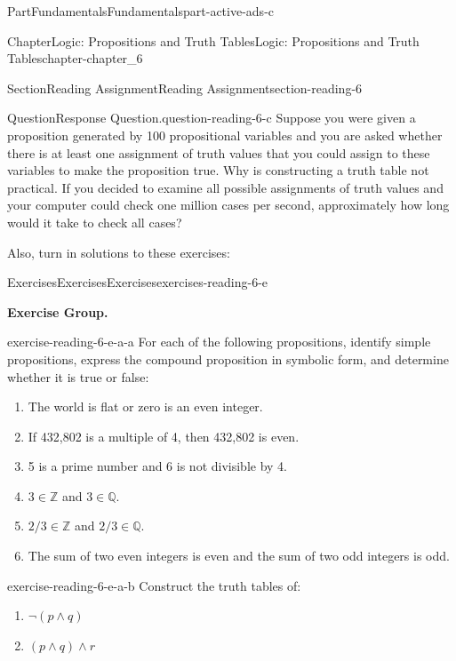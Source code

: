 \documentclass[oneside,10pt,]{book}
\numberwithin{equation}{section}
\begin{document}
\begin{partptx}{Part}{Fundamentals}{}{Fundamentals}{}{}{part-active-ads-c}
\begin{chapterptx}{Chapter}{Logic: Propositions and Truth Tables}{}{Logic: Propositions and Truth Tables}{}{}{chapter-chapter_6}
\begin{sectionptx}{Section}{Reading Assignment}{}{Reading Assignment}{}{}{section-reading-6}
\begin{question}{Question}{Response Question.}{question-reading-6-c}
Suppose you were given a proposition generated by 100 propositional variables and you are asked whether there is at least one assignment of truth values that you could assign to these variables to make the proposition true. Why is constructing a truth table not practical.  If you decided to examine all possible assignments of truth values and your computer could check one million cases per second, approximately how long would it take to check all cases?%
\end{question}
Also, turn in solutions to these exercises:%
%
%
\typeout{************************************************}
\typeout{************************************************}
%
\begin{exercises-subsection-numberless}{Exercises}{Exercises}{}{Exercises}{}{}{exercises-reading-6-e}
\par\medskip\noindent%
\textbf{Exercise Group.}\space\space%
\begin{exercisegroup}
\begin{divisionexerciseeg}{1}{}{}{exercise-reading-6-e-a-a}%
For each of the following propositions, identify simple propositions, express the compound proposition in symbolic form, and determine whether it is true or false:%
\par
%
\begin{enumerate}[label=(\alph*)]
\item{}The world is flat or zero is an even integer.%
\item{}If 432,802 is a multiple of 4, then 432,802 is even.%
\item{}5 is a prime number and 6 is not divisible by 4.%
\item{}\(3 \in \mathbb{Z}\) and \(3 \in  \mathbb{Q}\).%
\item{}\(2/3 \in  \mathbb{Z}\) and \(2/3 \in  \mathbb{Q}\).%
\item{}The sum of two even integers is even and the sum of two odd integers is odd.%
\end{enumerate}
%
\end{divisionexerciseeg}%
\begin{divisionexerciseeg}{2}{}{}{exercise-reading-6-e-a-b}%
Construct the truth tables of:%
\begin{multicols}{2}
\begin{enumerate}[label=(\alph*)]
\item{}\(\displaystyle \neg (p\land  q )\)%
\item{}\(\displaystyle (p \land q)\land r\)%
\end{enumerate}

\end{multicols}
\end{divisionexerciseeg}
\end{exercisegroup}
\end{exercises-subsection-numberless}
\end{sectionptx}
\end{chapterptx}
\end{partptx}
\end{document}
